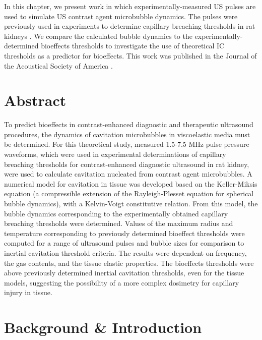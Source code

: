 In this chapter, we present work in which experimentally-measured
\ac{US} pulses are used to simulate \ac{US} contrast agent microbubble
dynamics. The pulses were previously used in experiments to determine
capillary breaching thresholds in rat kidneys \citep{Miller2008b}. We
compare the calculated bubble dynamics to the
experimentally-determined bioeffects thresholds to investigate the use
of theoretical \ac{IC} thresholds as a predictor for bioeffects. This
work was published in the Journal of the Acoustical Society of America
\citep{Patterson2012, Patterson2012a}.

\section{Abstract}
  To predict bioeffects in contrast-enhanced diagnostic and
  therapeutic ultrasound procedures, the dynamics of cavitation
  microbubbles in viscoelastic media must be determined.  For this
  theoretical study, measured 1.5-7.5 MHz pulse pressure waveforms,
  which were used in experimental determinations of capillary
  breaching thresholds for contrast-enhanced diagnostic ultrasound in
  rat kidney, were used to calculate cavitation nucleated from
  contrast agent microbubbles.  A numerical model for cavitation in
  tissue was developed based on the Keller-Miksis equation (a
  compressible extension of the Rayleigh-Plesset equation for
  spherical bubble dynamics), with a Kelvin-Voigt constitutive
  relation. From this model, the bubble dynamics corresponding to the
  experimentally obtained capillary breaching thresholds were
  determined. Values of the maximum radius and temperature
  corresponding to previously determined bioeffect thresholds were
  computed for a range of ultrasound pulses and bubble sizes for
  comparison to inertial cavitation threshold criteria.  The results
  were dependent on frequency, the gas contents, and the tissue
  elastic properties.  The bioeffects thresholds were above previously
  determined inertial cavitation thresholds, even for the tissue
  models, suggesting the possibility of a more complex dosimetry for
  capillary injury in tissue.

\acresetall

\section{Background \& Introduction}
\label{sec:usbe_bubble_intro}

